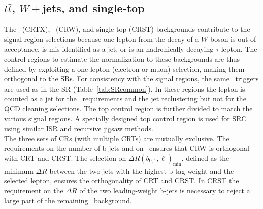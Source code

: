 %

\subsection{\boldmath$t\bar{t}$, \boldmath$W+$jets, and single-top}
\label{sec:1leptonCR}

The \ttbar\ (CRTX), \Wjets\ (CRW), and single-top (CRST)  backgrounds contribute to the signal region selections because one lepton from the decay of a $W$ boson is out of acceptance, is mis-identified as a jet, or is an hadronically decaying $\tau$-lepton. The control regions to estimate the normalization to these backgrounds are thus defined by exploiting a one-lepton (electron or muon) selection, making them orthogonal to the SRs. For consistency with the signal regions, the same \met\ triggers are used as in the SR (Table~\ref{tab:SRcommon}). In these regions the lepton is counted as a jet for the \pt\ requirements and the jet reclustering but not for the QCD cleaning selections. The top control region is further divided to match the various signal regions. A specially designed top control region is used for SRC using similar ISR and recursive jigsaw methods. \\


The three sets of CRs (with multiple CRTs) are mutually exclusive. The requirements on the number of b-jets and on \mantikttwelvezero\ ensures that CRW is orthogonal with CRT and CRST. The selection on $\Delta R(b_{0,1},\ell)_{\mathrm{min}}$, defined as the minimum $\Delta R$ between the two jets with the highest b-tag weight and the selected lepton, ensures the orthogonality of CRT and CRST. In CRST the requirement on the $\Delta R$ of the two leading-weight b-jets is necessary to reject a large part of the remaining \ttbar\ background.\\%

